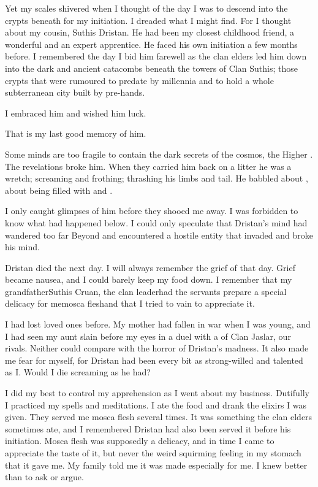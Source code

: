 \documentclass
  [a4paper,
   12pt,
   oneside
  ]%
  {article}
\begin{document}
Yet my scales shivered when I thought of the day I was to descend into the crypts beneath \Yormis for my initiation.
I dreaded what I might find.
For I thought about my cousin, Suthis Dristan. 
He had been my closest childhood friend, a wonderful \scatha and an expert apprentice. 
He faced his own initiation a few months before. 
I remembered the day I bid him farewell as the clan elders led him down into the dark and ancient catacombs beneath the towers of Clan Suthis; those crypts that were rumoured to predate \Yormis by millennia and to hold a whole subterranean city built by pre-\scathaese hands. 

I embraced him and wished him luck. 

That is my last good memory of him. 

Some minds are too fragile to contain the dark secrets of the cosmos, the Higher \Arcana.
The revelations broke him.  
When they carried him back on a litter he was a wretch; screaming and frothing; thrashing his limbs and tail. 
He babbled about , about being filled with  and .


I only caught glimpses of him before they shooed me away. 
I was forbidden to know what had happened below. 
I could only speculate that Dristan's mind had wandered too far Beyond and encountered a hostile entity that invaded and broke his mind. 

Dristan died the next day. 
I will always remember the grief of that day. 
Grief became nausea, and I could barely keep my food down. 
I remember that my grandfather\dash Suthis Cruan, the clan leader\dash had the servants prepare a special delicacy for me\dash mosca flesh\dash and that I tried to vain to appreciate it. 

I had lost loved ones before.
My mother had fallen in war when I was young, and I had seen my aunt slain before my eyes in a duel with a \scatha of Clan Jaslar, our rivals.%
\index{\scatha}
Neither could compare with the horror of Dristan's madness. 
It also made me fear for myself, for Dristan had been every bit as strong-willed and talented as I. 
Would I die screaming as he had?

I did my best to control my apprehension as I went about my business. 
Dutifully I practiced my spells and meditations. 
I ate the food and drank the elixirs I was given. 
They served me mosca flesh several times. 
It was something the clan elders sometimes ate, and I remembered Dristan had also been served it before his initiation. 
Mosca flesh was supposedly a delicacy, and in time I came to appreciate the taste of it, but never the weird squirming feeling in my stomach that it gave me. 
My family told me it was made especially for me. 
I knew better than to ask or argue. 
\end{document}
